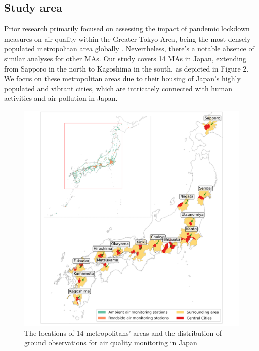 \subsection{Study area}
Prior research primarily focused on assessing the impact of pandemic lockdown measures on air quality within the Greater Tokyo Area, being the most densely populated metropolitan area globally \citep{damiani2022peculiar,zoran2023peculiar}. Nevertheless, there's a notable absence of similar analyses for other MAs. Our study covers 14 MAs in Japan, extending from Sapporo in the north to Kagoshima in the south, as depicted in Figure 2. We focus on these metropolitan areas due to their housing of Japan's highly populated and vibrant cities, which are intricately connected with human activities and air pollution in Japan.\par
\begin{figure}[p]
    \centering
    \includegraphics[width=\textwidth]{figs/chap4/fig2.png}
    \caption[Study area]{The locations of 14 metropolitans’ areas and the distribution of ground observations for air quality monitoring in Japan}
    \label{fig:chap4_fig2}
\end{figure}
